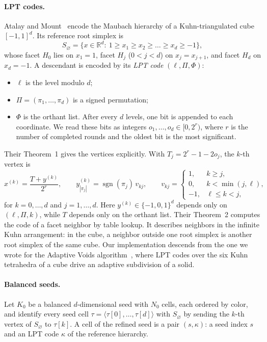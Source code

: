 \documentclass[11pt]{article}
\theoremstyle{plain}
\theoremstyle{definition}
\theoremstyle{remark}
\newcommand{\R}{\mathbb{R}}
\begin{document}
\paragraph{LPT codes.}
Atalay and Mount~\cite{atalaymount2007} encode the Maubach hierarchy of a
Kuhn-triangulated cube $[-1,1]^d$. Its reference root simplex is
\[
  S_\varnothing=\{x\in\R^d:\ 1\ge x_1\ge x_2\ge\dots\ge x_d\ge-1\},
\]
whose facet $H_0$ lies on $x_1=1$, facet $H_j$ ($0<j<d$) on $x_j=x_{j+1}$,
and facet $H_d$ on $x_d=-1$. A descendant is encoded by its \emph{LPT
code} $(\ell,\Pi,\Phi)$:
\begin{itemize}[itemsep=1pt]
\item $\ell$ is the level modulo $d$;
\item $\Pi=(\pi_1,\dots,\pi_d)$ is a signed permutation;
\item $\Phi$ is the orthant list. After every $d$ levels, one bit is
  appended to each coordinate. We read these bits as integers
  $o_1,\dots,o_d\in[0,2^r)$, where $r$ is the number of completed rounds
  and the oldest bit is the most significant.
\end{itemize}
Their Theorem~1 gives the vertices explicitly. With $T_j=2^r-1-2o_j$, the
$k$-th vertex is
\begin{equation}\label{eq:lpt-vertex}
  x^{(k)}=\frac{T+y^{(k)}}{2^r},\qquad
  y^{(k)}_{|\pi_j|}=\operatorname{sgn}(\pi_j)\,v_{kj},\qquad
  v_{kj}=\begin{cases}1,&k\ge j,\\0,&k<\min(j,\ell),\\-1,&\ell\le k<j,\end{cases}
\end{equation}
for $k=0,\dots,d$ and $j=1,\dots,d$. Here $y^{(k)}\in\{-1,0,1\}^d$ depends
only on $(\ell,\Pi,k)$, while $T$ depends only on the orthant list.
Their Theorem~2 computes the code of a facet neighbor by table lookup.
It describes neighbors in the infinite Kuhn arrangement: in the cube, a
neighbor outside one root simplex is another root simplex of the same
cube. Our implementation descends from the one we wrote for the Adaptive
Voids algorithm~\cite{sa2015adaptive}, where LPT codes over the six Kuhn
tetrahedra of a cube drive an adaptive subdivision of a solid.

\paragraph{Balanced seeds.}
Let $K_0$ be a balanced $d$-dimensional seed with $N_0$ cells, each ordered
by color, and identify every seed cell $\tau=\langle\tau[0],\dots,\tau[d]\rangle$
with $S_\varnothing$ by sending the $k$-th vertex of $S_\varnothing$ to
$\tau[k]$. A cell of the refined seed is a pair $(s,\kappa)$: a seed index
$s$ and an LPT code $\kappa$ of the reference hierarchy.
\end{document}
